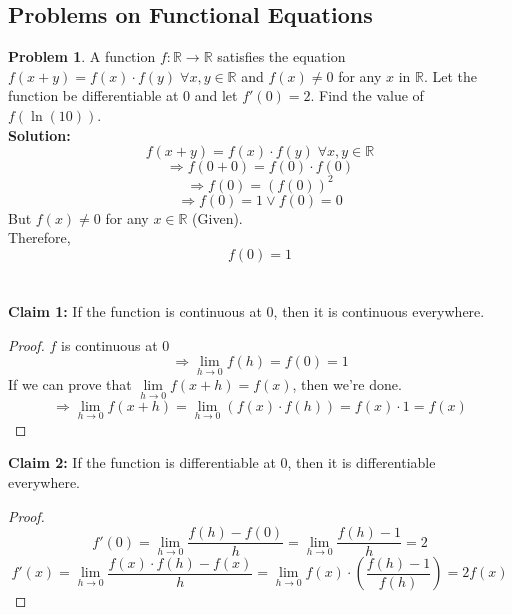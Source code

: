 \documentclass[14]{article}
\theoremstyle{definition}
\newtheorem{prob}{Problem}
\theoremstyle{case}
\begin{document}
\subsection{Problems on Functional Equations}
\begin{prob}
A function $f:\mathbb{R} \to \mathbb{R}$ satisfies the equation $f(x+y) = f(x)\cdot f(y) \; \forall x, y \in \mathbb{R}$ and $f(x) \neq 0$ for any $x$ in $\mathbb{R}$. Let the function be differentiable at $0$ and let $f'(0) = 2$. Find the value of $f(\ln(10))$.\\
\textbf{Solution:}
\[f(x+y) = f(x) \cdot f(y) \; \forall x, y \in \mathbb{R}\]
\[\Rightarrow f(0+0) = f(0) \cdot f(0)\]
\[\Rightarrow f(0) = \left(f(0) \right)^2\]
\[\Rightarrow f(0) = 1 \lor f(0) = 0\]
But $f(x) \neq 0$ for any $x \in \mathbb{R}$ (Given).\\
Therefore,
\[f(0) = 1\]
\\\\
\textbf{Claim 1:} If the function is continuous at $0$, then it is continuous everywhere.
\begin{proof}
$f$ is continuous at 0\\
\[\Rightarrow \lim\limits_{h \to 0} f(h) = f(0) = 1\]
If we can prove that $\lim\limits_{h \to 0} f(x+h) = f(x)$, then we're done.
\[\Rightarrow\lim\limits_{h \to 0} f(x+h) = \lim\limits_{h \to 0} \left( f(x) \cdot f(h) \right) = f(x) \cdot 1 = f(x)\]
\end{proof}
\textbf{Claim 2:} If the function is differentiable at $0$, then it is differentiable everywhere.
\begin{proof}
\[f'(0) =\lim\limits_{h \to 0}  \dfrac{f(h) - f(0)}{h} = \lim\limits_{h \to 0}\dfrac{f(h) - 1}{h} = 2\]
\[f'(x) =\lim\limits_{h \to 0} \dfrac{f(x)\cdot f(h) - f(x)}{h} = \lim\limits_{h \to 0} f(x) \cdot \left( \dfrac{f(h) - 1}{f(h)} \right) = 2f(x)\]

\end{proof}
\end{prob}
\end{document}
